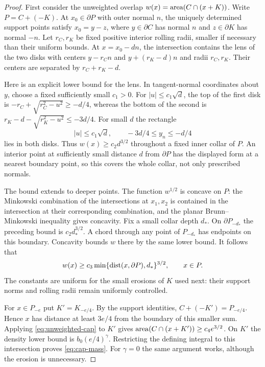 \begin{proof}
First consider the unweighted overlap
$w(x)=\operatorname{area}(C\cap(x+K))$. Write $P=C+(-K)$.
At $x_0\in\partial P$ with outer normal $n$, the uniquely determined
support points satisfy $x_0=y-z$, where $y\in\partial C$ has normal
$n$ and $z\in\partial K$ has normal $-n$. Let $r_C,r_K$ be fixed
positive interior rolling radii, smaller if necessary than their
uniform bounds. At $x=x_0-dn$, the intersection contains the lens of
the two disks with centers $y-r_Cn$ and $y+(r_K-d)n$ and radii
$r_C,r_K$. Their centers are separated by $r_C+r_K-d$.

Here is an explicit lower bound for the lens. In tangent-normal
coordinates about $y$, choose a fixed sufficiently small $c_1>0$.
For $|u|\le c_1\sqrt d$, the top of the first disk is
$-r_C+\sqrt{r_C^2-u^2}\ge-d/4$, whereas the bottom of the second is
$r_K-d-\sqrt{r_K^2-u^2}\le-3d/4$. For small $d$ the rectangle
\[
                  |u|\le c_1\sqrt d,\qquad
                         -3d/4\le y_n\le-d/4
\]
lies in both disks. Thus $w(x)\ge c_2d^{3/2}$ throughout a fixed
inner collar of $P$. An interior point at sufficiently small distance
$d$ from $\partial P$ has the displayed form at a nearest boundary
point, so this covers the whole collar, not only prescribed normals.

The bound extends to deeper points. The function $w^{1/2}$ is concave
on $P$: the Minkowski combination of the intersections at $x_1,x_2$
is contained in the intersection at their corresponding combination,
and the planar Brunn--Minkowski inequality gives concavity. Fix a small
collar depth $d_*$. On $\partial P_{-d_*}$ the preceding bound is
$c_2d_*^{3/2}$. A chord through any point of $P_{-d_*}$ has endpoints
on this boundary. Concavity bounds $w$ there by the same lower bound.
It follows that
\begin{equation}\label{eq:unweighted-cap}
 w(x)\ge c_3\min\{\operatorname{dist}(x,\partial P),d_*\}^{3/2},\qquad x\in P.
\end{equation}
The constants are uniform for the small erosions of $K$ used next:
their support norms and rolling radii remain uniformly controlled.

For $x\in P_{-e}$ put $K'=K_{-e/4}$. By the support identities,
$C+(-K')=P_{-e/4}$. Hence $x$ has distance at least $3e/4$ from
the boundary of this smaller sum. Applying \eqref{eq:unweighted-cap}
to $K'$ gives
$\operatorname{area}(C\cap(x+K'))\ge c_4e^{3/2}$. On $K'$ the density lower
bound is $b_0(e/4)^\gamma$. Restricting the defining integral to
this intersection proves \eqref{eq:cap-mass}. For $\gamma=0$ the
same argument works, although the erosion is unnecessary.
\end{proof}


